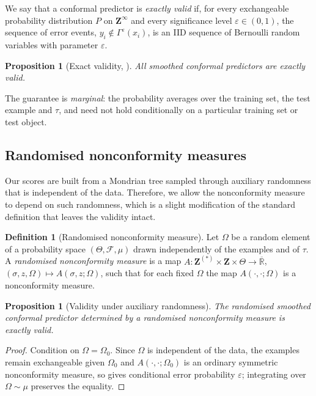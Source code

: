 \documentclass[twoside]{article}
\numberwithin{equation}{section}
\theoremstyle{plain}
\newtheorem{proposition}[theorem]{Proposition}
\theoremstyle{definition}
\newtheorem{definition}[theorem]{Definition}
\theoremstyle{remark}
\begin{document}
    We say that a conformal predictor is \emph{exactly valid} if, for every exchangeable probability distribution $P$ on $\mathbf{Z}^{\infty}$ and every significance level $\varepsilon\in(0,1)$, the sequence of error events, $y_i\notin\Gamma^{\varepsilon}(x_i)$, is an IID sequence of Bernoulli random variables with parameter $\varepsilon$. 
    \begin{proposition}[Exact validity, {\citealp[Prop.~2.4]{alrw2}}]\label{prop:smoothed-validity}
        All smoothed conformal predictors are exactly valid.
    \end{proposition}
    The guarantee is \emph{marginal}: the probability averages over the training set, the test example and $\tau$, and need not hold conditionally on a particular training set or test object.

    \subsection{Randomised nonconformity measures}\label{sec:bg-randomised}

        Our scores are built from a Mondrian tree sampled through auxiliary randomness that is independent of the data. Therefore, we allow the nonconformity measure to depend on such randomness, which is a slight modification of the standard definition that leaves the validity intact.

        \begin{definition}[Randomised nonconformity measure]\label{def:randomised-ncm}
            Let $\Omega$ be a random element of a probability space $(\Theta, \mathcal{F}, \mu)$ drawn independently of the examples and of $\tau$. A \emph{randomised nonconformity measure} is a map $A \colon \mathbf{Z}^{(*)} \times \mathbf{Z} \times \Theta \to \overline{\mathbb{R}}$, $(\sigma, z, \Omega) \mapsto A\!\left(\sigma, z ; \Omega\right)$, such that for each fixed $\Omega$ the map $A(\cdot, \cdot; \Omega)$ is a nonconformity measure.
        \end{definition}

        \begin{proposition}[Validity under auxiliary randomness]\label{prop:randomised-validity}
            The randomised smoothed conformal predictor determined by a randomised nonconformity measure is exactly valid.
        \end{proposition}
            
        \begin{proof}
            Condition on $\Omega = \Omega_0$. Since $\Omega$ is independent of the data, the examples remain exchangeable given $\Omega_0$ and $A(\cdot, \cdot; \Omega_0)$ is an ordinary symmetric nonconformity measure, so  gives conditional error probability $\varepsilon$; integrating over $\Omega \sim \mu$ preserves the equality.
        \end{proof}
\end{document}
